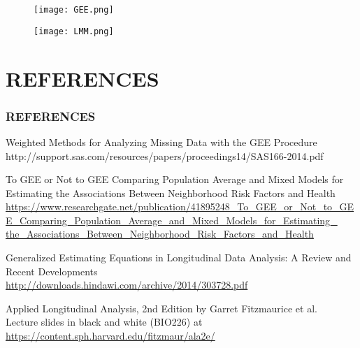 \documentclass[mathserif]{beamer}
\begin{document}
\begin{frame}
		
\begin{figure}
\centering
\texttt{[image: GEE.png]}

\texttt{[image: LMM.png]}
\end{figure}

\end{frame}
	
\section{REFERENCES}
\begin{frame}
	\frametitle{REFERENCES}
		
\begin{itemization}

\item Weighted Methods for Analyzing Missing Data with the GEE Procedure \\
{http://support.sas.com/resources/papers/proceedings14/SAS166-2014.pdf}

\item To GEE or Not to GEE Comparing Population Average and Mixed Models for Estimating the Associations Between Neighborhood Risk Factors 
and Health\\
	\url{https://www.researchgate.net/publication/41895248_To_GEE_or_Not_to_GEE_Comparing_Population_Average_and_Mixed_Models_for_Estimating_
	the_Associations_Between_Neighborhood_Risk_Factors_and_Health}
	
\item Generalized Estimating Equations in Longitudinal Data Analysis: A Review and Recent Developments\\
		\url{http://downloads.hindawi.com/archive/2014/303728.pdf}

\item Applied Longitudinal Analysis, 2nd Edition by Garret Fitzmaurice et al.\\
	Lecture slides in black and white (BIO226) at\\
	\url{https://content.sph.harvard.edu/fitzmaur/ala2e/} 
\end{itemization}
	
\end{frame}
	
\end{document}

